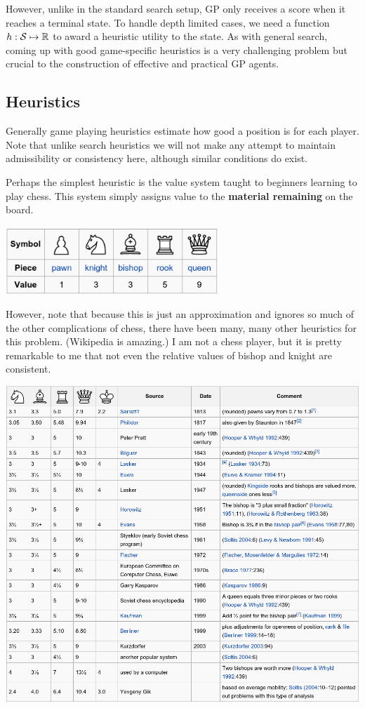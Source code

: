 \documentclass[11pt]{article}
\begin{document}
However, unlike in the standard search setup, GP only receives a score when it reaches a terminal state. To handle depth limited cases, we need a function $h: \mathcal{S} \mapsto \mathbb{R}$ to award a heuristic utility to the state. As with general search, coming up with good game-specific heuristics is a very challenging problem but crucial to the construction of effective and practical GP agents.  

\subsection{Heuristics}

Generally game playing heuristics estimate how good a position is for each player. Note that unlike search heuristics we will not make any attempt to maintain admissibility or consistency here, although similar conditions do exist.

Perhaps the simplest heuristic is the value system taught to beginners learning to play chess. This system simply assigns value to the \textbf{material remaining} on the board. 
\air

\centerline{\includegraphics[width=8cm]{../pics/chessvalues1}}
\air

However, note that because this is just an approximation and ignores so much of the other complications of chess, there have been many, many other heuristics for this problem. (Wikipedia is amazing.) I am not a chess player, but it is pretty remarkable to me that not even the relative values of bishop and knight are consistent.

\centerline{ \includegraphics[width=16cm]{../pics/chess_value}}
\vspace{1cm}
\end{document}
